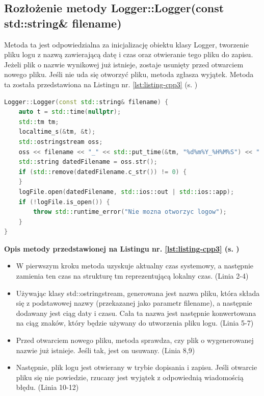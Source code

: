 \subsection{Rozłożenie metody Logger::Logger(const std::string\& filename)}
Metoda ta jest odpowiedzialna za inicjalizację obiektu klasy Logger, tworzenie pliku logu z nazwą zawierającą datę i czas oraz otwieranie tego pliku do zapisu. Jeżeli plik o nazwie wynikowej już istnieje, zostaje usunięty przed otwarciem nowego pliku. Jeśli nie uda się otworzyć pliku, metoda zgłasza wyjątek. Metoda ta została przedstawiona na Listingu nr. \ref{lst:listing-cpp3} (s. \pageref{lst:listing-cpp3})
\begin{lstlisting}[caption=Logger::Logger(const std::string\& filename), label={lst:listing-cpp3}, language=C++]
Logger::Logger(const std::string& filename) {
    auto t = std::time(nullptr);
    std::tm tm;
    localtime_s(&tm, &t);
    std::ostringstream oss;
    oss << filename << "_" << std::put_time(&tm, "%d%m%Y_%H%M%S") << ".txt";
    std::string datedFilename = oss.str();
    if (std::remove(datedFilename.c_str()) != 0) {
    }
    logFile.open(datedFilename, std::ios::out | std::ios::app);
    if (!logFile.is_open()) {
        throw std::runtime_error("Nie mozna otworzyc logow");
    }
}
\end{lstlisting}
\textbf{Opis metody przedstawionej na Listingu nr. \ref{lst:listing-cpp3} (s. \pageref{lst:listing-cpp3}) }
\begin{itemize}
    \item W pierwszym kroku metoda uzyskuje aktualny czas systemowy, a następnie zamienia ten czas na strukturę tm reprezentującą lokalny czas. (Linia 2-4)
    \item Używając klasy std::ostringstream, generowana jest nazwa pliku, która składa się z podstawowej nazwy (przekazanej jako parametr filename), a następnie dodawany jest ciąg daty i czasu. Cała ta nazwa jest następnie konwertowana na ciąg znaków, który będzie używany do utworzenia pliku logu. (Linia 5-7)
    \item Przed otwarciem nowego pliku, metoda sprawdza, czy plik o wygenerowanej nazwie już istnieje. Jeśli tak, jest on usuwany. (Linia 8,9)
    \item Następnie, plik logu jest otwierany w trybie dopisania i zapisu. Jeśli otwarcie pliku się nie powiedzie, rzucany jest wyjątek z odpowiednią wiadomością błędu. (Linia 10-12)
\end{itemize}
\newpage
